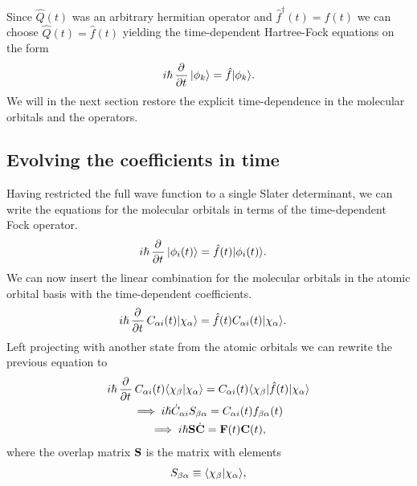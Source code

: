        Since $\hat{Q}(t)$ was an arbitrary hermitian operator and
        $\hat{f}^{\dagger}(t) = \hat{f}(t)$ we can choose $\hat{Q}(t) =
        \hat{f}(t)$ yielding the time-dependent Hartree-Fock equations on the
        form
        \begin{align}
            i\hslash\dpd{}{t}\ket{\phi_k}
            = \hat{f}\ket{\phi_k}.
        \end{align}
        We will in the next section restore the explicit time-dependence in the
        molecular orbitals and the operators.

    \subsection{Evolving the coefficients in time}
        Having restricted the full wave function to a single Slater determinant,
        we can write the equations for the molecular orbitals in terms of the
        time-dependent Fock operator.
        \begin{align}
            i\hslash\dpd{}{t}\ket{\phi_i(t)}
            &= \hat{f}(t)\ket{\phi_i(t)}.
        \end{align}
        We can now insert the linear combination for the molecular orbitals in
        the atomic orbital basis with the time-dependent coefficients.
        \begin{align}
            i\hslash\dpd{}{t}C_{\alpha i}(t)\ket{\chi_{\alpha}}
            &= \hat{f}(t)C_{\alpha i}(t)\ket{\chi_{\alpha}}.
        \end{align}
        Left projecting with another state from the atomic orbitals we can rewrite
        the previous equation to
        \begin{gather}
            i\hslash\dpd{}{t}C_{\alpha i}(t)\braket{\chi_{\beta}}{\chi_{\alpha}}
            =
            C_{\alpha i}(t)\bra{\chi_{\beta}}\hat{f}(t)\ket{\chi_{\alpha}}
            \\
            \implies
            i\hslash \dot{C}_{\alpha i} S_{\beta\alpha}
            = C_{\alpha i}(t)f_{\beta\alpha}(t)
            \\
            \implies
            i\hslash \vf{S}\dot{\vf{C}}
            = \vf{F}(t)\vf{C}(t),
            \label{eq:tdhf-equations}
        \end{gather}
        where the overlap matrix $\mathbf{S}$ is the matrix with elements
        \begin{align}
            S_{\beta\alpha} \equiv \langle \chi_{\beta} | \chi_{\alpha} \rangle,
            \label{eq:overlap_ao}
        \end{align}
